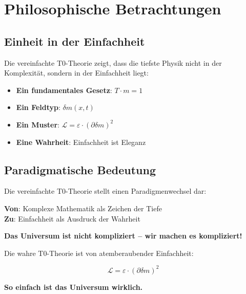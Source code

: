 \documentclass[12pt,a4paper]{article}
\newcommand{\deltam}{\delta m}
\newcommand{\Lag}{\mathcal{L}}
\theoremstyle{definition}
\theoremstyle{remark}
\begin{document}
	\section{Philosophische Betrachtungen}
	
	\subsection{Einheit in der Einfachheit}
	
	\begin{tcolorbox}[colback=green!5!white,colframe=green!75!black,title=Philosophische Erkenntnis]
		Die vereinfachte T0-Theorie zeigt, dass die tiefste Physik nicht in der Komplexität, sondern in der Einfachheit liegt:
		
		\begin{itemize}
			\item \textbf{Ein fundamentales Gesetz}: $T \cdot m = 1$
			\item \textbf{Ein Feldtyp}: $\deltam(x,t)$
			\item \textbf{Ein Muster}: $\Lag = \varepsilon \cdot (\partial \deltam)^2$
			\item \textbf{Eine Wahrheit}: Einfachheit ist Eleganz
		\end{itemize}
	\end{tcolorbox}
	
	\subsection{Paradigmatische Bedeutung}
	
	\begin{tcolorbox}[colback=red!5!white,colframe=red!75!black,title=Paradigmenwechsel]
		Die vereinfachte T0-Theorie stellt einen Paradigmenwechsel dar:
		
		\textbf{Von}: Komplexe Mathematik als Zeichen der Tiefe \\
		\textbf{Zu}: Einfachheit als Ausdruck der Wahrheit
		
		\textbf{Das Universum ist nicht kompliziert -- wir machen es kompliziert!}
	\end{tcolorbox}
	
	Die wahre T0-Theorie ist von atemberaubender Einfachheit:
	
	\begin{equation}
		\boxed{\Lag = \varepsilon \cdot (\partial \deltam)^2}
	\end{equation}
	
	\textbf{So einfach ist das Universum wirklich.}
	
\end{document}
